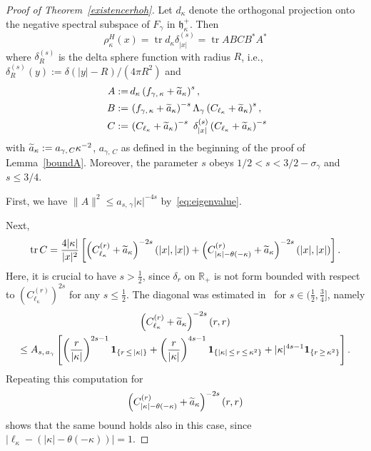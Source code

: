 \documentclass[AHL,Unicode,longabstracts,published]{cedram}
\DeclareMathOperator{\tr}{tr}
\newcommand*\rz{\mathbb{R}}
\newcommand{\one}{\mathbf{1}}
\newcommand*\gh{\mathfrak{h}}
\newcommand*\ghpk{{\gh^+_\kappa}}
\let\oldtilde\tilde
\renewcommand*{\tilde}[1]{\mathchoice{\widetilde{#1}}{\widetilde{#1}}{\oldtilde{#1}}{\oldtilde{#1}}}
\begin{document}
\begin{proof}[{Proof of Theorem~\ref{existencerhoh}}]
Let $d_\kappa$ denote the orthogonal projection onto the negative spectral subspace of $F_\gamma$ in $\ghpk$. Then
\[
\rho_{\kappa}^H(x) = \tr d_\kappa \delta^{(s)}_{|x|} = \tr ABCB^*A^*
\]
where $\delta^{(s)}_R$ is the delta sphere function with radius $R$, i.e., $\delta^{(s)}_R(y):=\delta(|y|-R)/(4\pi R^2)$ and
\begin{equation}
\begin{split}
A:=\,&d_\kappa\left(f_{\gamma,\,\kappa}+\tilde a_\kappa\right)^s,\\
B:=\,&\left(f_{\gamma,\,\kappa}+\tilde a_\kappa\right)^{-s}\Lambda_\gamma\left(C_{\ell_\kappa}+\tilde a_\kappa\right)^s,\\\
C:=\,&\left(C_{\ell_\kappa}+\tilde a_\kappa\right)^{-s}\ \delta_{|x|}^{(s)} \left(C_{\ell_\kappa}+\tilde a_\kappa\right)^{-s}
\end{split}
\end{equation}
with $\tilde a_\kappa:=a_{\gamma,\,C}\kappa^{-2}$, $a_{\gamma,\,C}$ as defined in the beginning of the proof of Lemma~\ref{boundA}. Moreover, the parameter $s$ obeys $1/2<s<3/2-\sigma_\gamma$ and $s\leq3/4$.

First, we have $\|A\|^2\leq a_{s,\,\gamma} |\kappa|^{-4s}$ by~\eqref{eq:eigenvalue}.

Next,
\[
\tr C=\frac{4|\kappa|}{|x|^2}\left[\left(C_{\ell_\kappa}^{(r)}+\tilde a_\kappa\right)^{-2s}(|x|,|x|) + \left(C_{|\kappa|-\theta(-\kappa)}^{(r)}+\tilde a_\kappa\right)^{-2s}(|x|,|x|)\right].
\]
Here, it is crucial to have $s>\tfrac12$, since $\delta_r$ on $\rz_+$ is not form bounded with respect to $(C_{\ell_\kappa}^{(r)})^{2s}$ for any $s\leq\tfrac12$. The diagonal was estimated in~\cite[Lemma~A.2]{Franketal2020P} for $s\in(\tfrac12,\tfrac34]$, namely
\begin{multline*}
\left(C_{\ell_\kappa}^{(r)}+\tilde a_\kappa\right)^{-2s}(r,r) \\
\leq A_{s,\,a_\gamma}\left[\left(\frac{r}{|\kappa|}\right)^{2s-1}\one_{\left\{r\,\leq\,|\kappa|\right\}} + \left(\frac{r}{|\kappa|}\right)^{4s-1}\one_{\left\{|\kappa|\,\leq\,r\,\leq\,\kappa^2\right\}} + |\kappa|^{4s-1}\one_{\left\{r\,\geq\,\kappa^2\right\}}\right].
\end{multline*}
Repeating this computation for
\[
\left(C_{|\kappa|-\theta(-\kappa)}^{(r)}+\tilde a_\kappa\right)^{-2s}(r,r)
\]
shows that the same bound holds also in this case, since $|\ell_\kappa-(|\kappa|-\theta(-\kappa))|=1$.


\end{proof}
\end{document}
